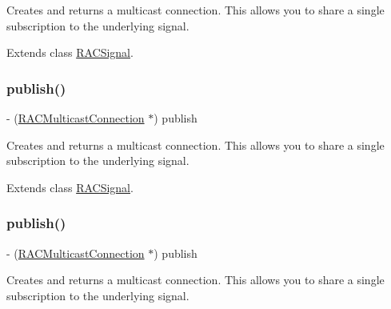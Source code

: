 Creates and returns a multicast connection. This allows you to share a single subscription to the underlying signal. 

Extends class \mbox{\hyperlink{interface_r_a_c_signal_a16f260eea2cfd9a3953b95926d442a93}{R\+A\+C\+Signal}}.

\mbox{\label{category_r_a_c_signal_07_operations_08_a16f260eea2cfd9a3953b95926d442a93}} 
\subsubsection{\texorpdfstring{publish()}{publish()}\hspace{0.1cm}{\footnotesize\ttfamily [2/3]}}
{\footnotesize\ttfamily -\/ (\mbox{\hyperlink{interface_r_a_c_multicast_connection}{R\+A\+C\+Multicast\+Connection}} $\ast$) publish \begin{DoxyParamCaption}{ }\end{DoxyParamCaption}}

Creates and returns a multicast connection. This allows you to share a single subscription to the underlying signal. 

Extends class \mbox{\hyperlink{interface_r_a_c_signal_a16f260eea2cfd9a3953b95926d442a93}{R\+A\+C\+Signal}}.

\mbox{\label{category_r_a_c_signal_07_operations_08_a16f260eea2cfd9a3953b95926d442a93}} 
\subsubsection{\texorpdfstring{publish()}{publish()}\hspace{0.1cm}{\footnotesize\ttfamily [3/3]}}
{\footnotesize\ttfamily -\/ (\mbox{\hyperlink{interface_r_a_c_multicast_connection}{R\+A\+C\+Multicast\+Connection}} $\ast$) publish \begin{DoxyParamCaption}{ }\end{DoxyParamCaption}}

Creates and returns a multicast connection. This allows you to share a single subscription to the underlying signal. 

